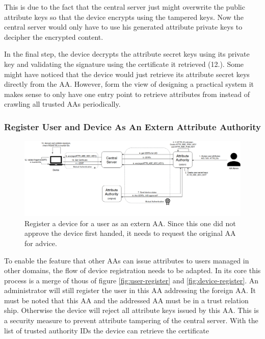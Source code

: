 This is due to the fact that the central server just might overwrite the public attribute keys so that the device encrypts using the tampered keys. Now the central server would only have to use his generated attribute private keys to decipher the encrypted content. 

In the final step, the device decrypts the attribute secret keys using its private key and validating the signature using the certificate it retrieved (12.). Some might have noticed that the device would just retrieve its attribute secret keys directly from the AA. However, form the view of designing a practical system it makes sense to only have one entry point to retrieve attributes from instead of crawling all trusted AAs periodically. 


\subsubsection{Register User and Device As An Extern Attribute Authority}
\begin{figure}[!h]
\centering
    \includegraphics[width=\linewidth]{img/device_register2.png}
    \caption{Register a device for a user as an extern AA. Since this one did not approve the device first handed, it needs to request the original AA for advice.}
    \label{fig:device-register2}
\end{figure}
To enable the feature that other AAs can issue attributes to users managed in other domains, the flow of device registration needs to be adapted.  In its core this process is a merge of thous of figure \ref{fig:user-register} and \ref{fig:device-register}. An administrator will still register the user in this AA addressing the foreign AA. It must be noted that this AA and the addressed AA must be in a trust relation ship. Otherwise the device will reject all attribute keys issued by this AA. This is a security measure to prevent attribute tampering of the central server. With the list of trusted authority IDs the device can retrieve the certificate 

